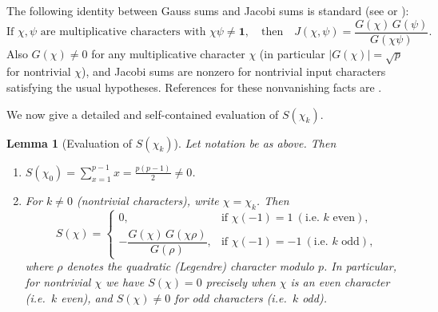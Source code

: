 \documentclass[11pt,a4paper]{article}
\theoremstyle{plain}
\newtheorem{lemma}{Lemma}
\theoremstyle{definition}
\begin{document}
The following identity between Gauss sums and Jacobi sums is standard (see \cite[Ch.~11]{Davenport} or \cite[Ch.~8]{Berndt}):
\begin{equation}\label{eq:J-G-relation}
\text{If }\chi,\psi\text{ are multiplicative characters with }\chi\psi\neq \mathbf{1},
\quad\text{then}\quad
J(\chi,\psi)=\frac{G(\chi)\,G(\psi)}{G(\chi\psi)}.
\end{equation}
Also $G(\chi)\neq 0$ for any multiplicative character $\chi$ (in particular $|G(\chi)|=\sqrt{p}$ for nontrivial $\chi$), and Jacobi sums are nonzero for nontrivial input characters satisfying the usual hypotheses. References for these nonvanishing facts are \cite{Davenport,Berndt}.

We now give a detailed and self-contained evaluation of $S(\chi_k)$.


\begin{lemma}[Evaluation of $S(\chi_k)$]

\label{lemma:gauss}
Let notation be as above. Then
\begin{enumerate}
    \item $S(\chi_0)=\displaystyle\sum_{x=1}^{p-1} x=\frac{p(p-1)}{2}\neq 0$.
    \item For $k\neq 0$ (nontrivial characters), write $\chi=\chi_k$. Then
    \[
    S(\chi)=
    \begin{cases}
    0, & \text{if }\chi(-1)=1\ (\text{i.e.\ }k\text{ even}),\\[6pt]
    -\dfrac{G(\chi)\,G(\chi\rho)}{G(\rho)}, & \text{if }\chi(-1)=-1\ (\text{i.e.\ }k\text{ odd}),
    \end{cases}
    \]
    where $\rho$ denotes the quadratic (Legendre) character modulo $p$. In particular, for nontrivial $\chi$ we have $S(\chi)=0$ precisely when $\chi$ is an even character (i.e.\ $k$ even), and $S(\chi)\neq 0$ for odd characters (i.e.\ $k$ odd).
\end{enumerate}
\end{lemma}
\end{document}
